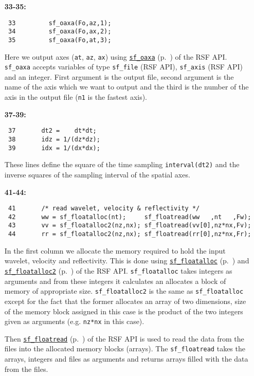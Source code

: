 \begin{itemize}
\item [\bf 33-35:]
\begin{verbatim}
 33         sf_oaxa(Fo,az,1); 
 34         sf_oaxa(Fo,ax,2); 
 35         sf_oaxa(Fo,at,3);
\end{verbatim}

Here we output axes (\texttt{at}, \texttt{az}, \texttt{ax}) using \hyperref[sec:sf_oaxa]{\texttt{sf\_oaxa}} (p.~\pageref{sec:sf_oaxa}) of the RSF API. \texttt{sf\_oaxa} accepts variables of type \texttt{sf\_file} (RSF API), \texttt{sf\_axis} (RSF API) and an integer. First argument is the output file, second argument is the name of the axis which we want to output and the third is the number of the axis in the output file (\texttt{n1} is the fastest axis).

\item [\bf 37-39:]
\begin{verbatim}
 37       dt2 =    dt*dt;
 38       idz = 1/(dz*dz);
 39       idx = 1/(dx*dx);
\end{verbatim}

These lines define the square of the time sampling \texttt{interval(dt2)} and the inverse squares of the sampling interval of the spatial axes.
          

\item [\bf 41-44:]
\begin{verbatim}
 41       /* read wavelet, velocity & reflectivity */
 42       ww = sf_floatalloc(nt);     sf_floatread(ww   ,nt   ,Fw);
 43       vv = sf_floatalloc2(nz,nx); sf_floatread(vv[0],nz*nx,Fv);
 44       rr = sf_floatalloc2(nz,nx); sf_floatread(rr[0],nz*nx,Fr);
\end{verbatim}

In the first column we allocate the memory required to hold the input wavelet, velocity and reflectivity. This is done using \hyperref[sec:sf_floatalloc]{\texttt{sf\_floatalloc}} (p.~\pageref{sec:sf_floatalloc}) and \hyperref[sec:sf_floatalloc2]{\texttt{sf\_floatalloc2}} (p.~\pageref{sec:sf_floatalloc2}) of the RSF API. \texttt{sf\_floatalloc} takes integers as arguments and from these integers it calculates an allocates a block of memory of appropriate size. \texttt{sf\_floatalloc2}         is the same as \texttt{sf\_floatalloc} except for the fact that the former allocates an array of two dimensions, size of the memory block assigned in this case is the product of the two integers given as arguments (e.g. \texttt{nz*nx} in this case).  

Then \hyperref[sec:sf_floatread]{\texttt{sf\_floatread}} (p.~\pageref{sec:sf_floatread}) of the RSF API is used to read the data from the files into the allocated memory blocks (arrays). The \texttt{sf\_floatread} takes the arrays, integers and files as arguments and returns arrays filled with the data from the files.



\end{itemize}
